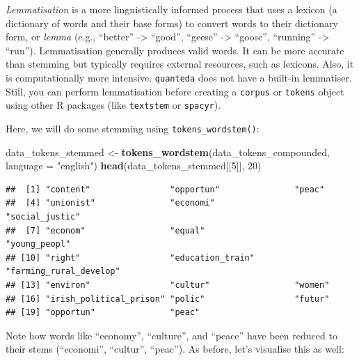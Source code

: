 \documentclass[
]{book}
\newenvironment{Shaded}{\begin{snugshade}}{\end{snugshade}}
\newcommand{\AttributeTok}[1]{\textcolor[rgb]{0.13,0.29,0.53}{#1}}
\newcommand{\DecValTok}[1]{\textcolor[rgb]{0.00,0.00,0.81}{#1}}
\newcommand{\FunctionTok}[1]{\textcolor[rgb]{0.13,0.29,0.53}{\textbf{#1}}}
\newcommand{\NormalTok}[1]{#1}
\newcommand{\OtherTok}[1]{\textcolor[rgb]{0.56,0.35,0.01}{#1}}
\newcommand{\StringTok}[1]{\textcolor[rgb]{0.31,0.60,0.02}{#1}}
\begin{document}
\emph{Lemmatisation} is a more linguistically informed process that uses a lexicon (a dictionary of words and their base forms) to convert words to their dictionary form, or \emph{lemma} (e.g., ``better'' -\textgreater{} ``good'', ``geese'' -\textgreater{} ``goose'', ``running'' -\textgreater{} ``run''). Lemmatisation generally produces valid words. It can be more accurate than stemming but typically requires external resources, such as lexicons. Also, it is computationally more intensive. \texttt{quanteda} does not have a built-in lemmatiser. Still, you can perform lemmatisation before creating a \texttt{corpus} or \texttt{tokens} object using other R packages (like \texttt{textstem} or \texttt{spacyr}).

Here, we will do some stemming using \texttt{tokens\_wordstem()}:

\begin{Shaded}
\begin{Highlighting}[]
\NormalTok{data\_tokens\_stemmed }\OtherTok{\textless{}{-}} \FunctionTok{tokens\_wordstem}\NormalTok{(data\_tokens\_compounded, }\AttributeTok{language =} \StringTok{"english"}\NormalTok{)}
\FunctionTok{head}\NormalTok{(data\_tokens\_stemmed[[}\DecValTok{5}\NormalTok{]], }\DecValTok{20}\NormalTok{)}
\end{Highlighting}
\end{Shaded}

\begin{verbatim}
##  [1] "content"                "opportun"               "peac"                  
##  [4] "unionist"               "economi"                "social_justic"         
##  [7] "econom"                 "equal"                  "young_peopl"           
## [10] "right"                  "education_train"        "farming_rural_develop" 
## [13] "environ"                "cultur"                 "women"                 
## [16] "irish_political_prison" "polic"                  "futur"                 
## [19] "opportun"               "peac"
\end{verbatim}

Note how words like ``economy'', ``culture'', and ``peace'' have been reduced to their stems (``economi'', ``cultur'', ``peac''). As before, let's visualise this as well:
\end{document}
